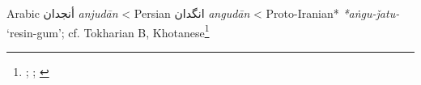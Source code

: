 \begin{etymology}\label{ety:anjudan}
Arabic {أنجدان} \textit{anjudān}
< Persian {انگدان‎} \textit{angudān}
< Proto-Iranian* \textit{*aṅgu-ǰatu-} `resin-gum'; cf. Tokharian B, Khotanese\footnote{\textcite[79-80]{lane_arabic-english_1863}; \textcite[114, 106]{steingass_comprehensive_1892}; \textcite[7]{adams_dictionary_2013}}
\end{etymology}